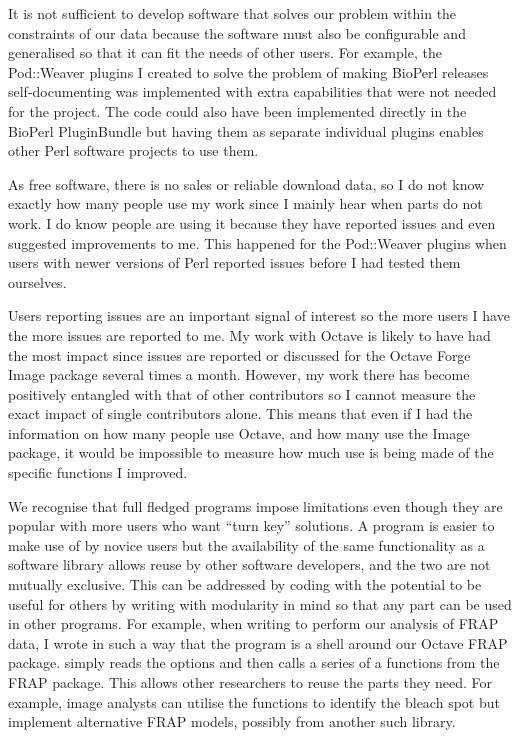 It is not sufficient to develop software that solves our problem
within the constraints of our data
because the software must also be configurable and
generalised so that it can fit the needs of other users.  For example, the
Pod::Weaver plugins I created to solve the problem of making BioPerl
releases self-documenting was implemented
with extra capabilities that were not needed
for the project.
The code could also have been implemented
directly in the BioPerl PluginBundle but having
them as separate individual plugins enables other Perl software projects to use
them.

As free software, there is no sales or reliable download data, so
I do not know exactly how many people use
my work since I mainly hear when parts do not work.  I do
know people are using it because they have reported issues and even suggested
improvements to me.  This happened for the Pod::Weaver plugins
when users with newer versions of Perl
reported issues before I had tested them ourselves.

Users reporting issues are an important signal of interest so
the more users I have the more issues are reported to me.
My work with Octave is likely to have had the most impact since
issues are reported or discussed for the Octave Forge Image package
several times a month.  However, my work there has
become positively entangled with that of other contributors
so I cannot measure the exact impact of single contributors alone.
This means that even if I had the information on how many people use Octave,
and how many use the Image package, it would be impossible to measure
how much use is being made of the specific
functions I improved.

We recognise that full fledged programs impose limitations even though
they are popular with more users who want ``turn key'' solutions.
A program is easier to make use of by novice users
but the availability of the same functionality as a software library allows
reuse by other software developers, and the two are not mutually exclusive.
This can be addressed by coding with the potential to be useful for
others by writing with modularity in mind so that any part can be used in
other programs.  For example, when writing 
to perform our analysis of FRAP data, I wrote in such a way that the
program is a shell around our Octave FRAP
package.   simply reads the options and then calls
a series of a functions from the FRAP package.
This allows other
researchers to reuse the parts they need.  For example, image analysts
can utilise
the functions to identify the bleach spot but implement alternative FRAP
models, possibly from another such library.

